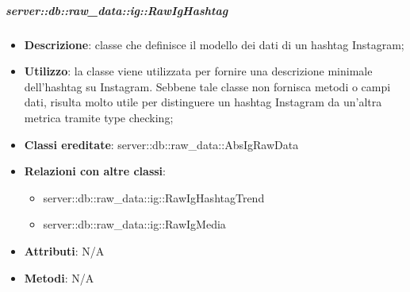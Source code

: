 		\subparagraph{server::db::raw\_data::ig::RawIgHashtag} %
		\label{subp:server_db_raw_data_ig_rawighashtag}
			\begin{itemize}
				\item \textbf{Descrizione}: classe che definisce il modello dei dati di un hashtag Instagram;
				\item \textbf{Utilizzo}: la classe viene utilizzata per fornire una descrizione minimale dell'hashtag su Instagram. Sebbene tale classe non fornisca metodi o campi dati, risulta molto utile per distinguere un hashtag Instagram da un'altra metrica tramite type checking;
				\item \textbf{Classi ereditate}: server::db::raw\_data::AbsIgRawData
				\item \textbf{Relazioni con altre classi}:
					\begin{itemize}
						\item server::db::raw\_data::ig::RawIgHashtagTrend
						\item server::db::raw\_data::ig::RawIgMedia
					\end{itemize}
				\item \textbf{Attributi}: N/A
				\item \textbf{Metodi}: N/A
			\end{itemize}


